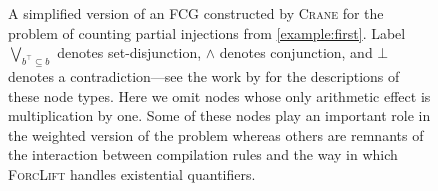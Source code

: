 \begin{figure}[t]
  \centering
  \caption{A simplified version of an FCG constructed by \textsc{Crane} for the
    problem of counting partial injections from \cref{example:first}. Label
    $\bigvee_{b^\top \subseteq b}$ denotes set-disjunction, $\land$ denotes
    conjunction, and $\bot$ denotes a contradiction---see the work by
    \citet{DBLP:conf/ijcai/BroeckTMDR11} for the descriptions of these node
    types. Here we omit nodes whose only arithmetic effect is multiplication by
    one. Some of these nodes play an important role in the weighted version of
    the problem whereas others are remnants of the interaction between
    compilation rules and the way in which \textsc{ForcLift} handles existential
    quantifiers.}\label{fig:examplefcg}
\end{figure}

